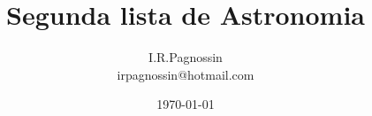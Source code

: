 \documentclass[a4paper,10pt]{article}
\begin{document}
\pagestyle{myheadings}
\renewcommand{\thefootnote}{\fnsymbol{footnote}}

\title {Segunda lista de Astronomia}  
\author {I.R.Pagnossin \\ irpagnossin@hotmail.com}
\date {\today}
\maketitle


\vspace{10mm}

\vspace{10mm}

\vspace{10mm}

\vspace{10mm}

\vspace{10mm}
 
\vspace{10mm}
 
\vspace{10mm}
 
\vspace{10mm}
 
\vspace{10mm} 
 
\vspace{10mm}
 
\vspace{10mm}
 
\vspace{10mm}
 
\vspace{10mm}
 
\vspace{10mm}
  
\vspace{10mm}
 
\end{document}
